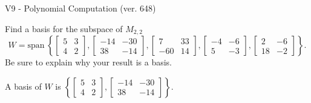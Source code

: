 \begin{exercise}
  \begin{exerciseTitle}V9 - Polynomial Computation (ver. 648)\end{exerciseTitle}
  \begin{exerciseStatement}
    Find a basis for the subspace of \(M_{2,2}\) 
\[W=\mathrm{span}\ \left\{\left[\begin{array}{cc}
5 & 3 \\
4 & 2
\end{array}\right] , \left[\begin{array}{cc}
-14 & -30 \\
38 & -14
\end{array}\right] , \left[\begin{array}{cc}
7 & 33 \\
-60 & 14
\end{array}\right] , \left[\begin{array}{cc}
-4 & -6 \\
5 & -3
\end{array}\right] , \left[\begin{array}{cc}
2 & -6 \\
18 & -2
\end{array}\right]\right\}.\]
 Be sure to explain why your result is a basis.


  \end{exerciseStatement}
  \begin{exerciseAnswer}
   A basis of \(W\) is  \(\left\{\left[\begin{array}{cc}
5 & 3 \\
4 & 2
\end{array}\right] , \left[\begin{array}{cc}
-14 & -30 \\
38 & -14
\end{array}\right]\right\}\).
  


  \end{exerciseAnswer}
\end{exercise}